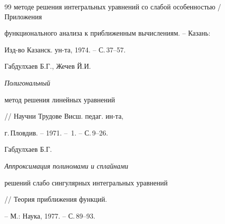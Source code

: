 \begin{thebibliography}{99}
{методе решения интегральных уравнений со слабой особенностью} / Приложения


функционального анализа к приближенным вычислениям. -- Казань:


Изд-во Казанск. ун-та, 1974. -- С.\,37--57.




Габдулхаев Б.Г., Жечев Й.И. {\em Полигональный


метод решения линейных уравнений} // Научни Трудове Висш. педаг. ин-та,


г.\,Пловдив. -- 1971. -- \No\,1. -- С.\,9--26.




Габдулхаев Б.Г. {\em Аппроксимация полиномами и сплайнами


решений слабо сингулярных интегральных уравнений}


// Теория приближения функций.


-- М.: Наука, 1977. -- С.\,89--93.





\end{thebibliography}





\vskip 0.5cm












\label{end}









